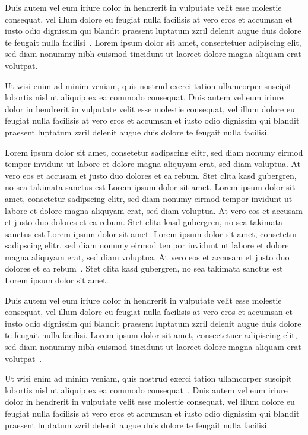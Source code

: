 \documentclass[journal]{vgtc}
\begin{document}
Duis autem vel eum iriure dolor in hendrerit in vulputate velit esse
molestie consequat, vel illum dolore eu feugiat nulla facilisis at
vero eros et accumsan et iusto odio dignissim qui blandit praesent
luptatum zzril delenit augue duis dolore te feugait nulla
facilisi~\cite{notes2002}. Lorem ipsum dolor sit amet, consectetuer
adipiscing elit, sed diam nonummy nibh euismod tincidunt ut laoreet
dolore magna aliquam erat volutpat.

Ut wisi enim ad minim veniam, quis nostrud exerci tation ullamcorper
suscipit lobortis nisl ut aliquip ex ea commodo consequat. Duis autem
vel eum iriure dolor in hendrerit in vulputate velit esse molestie
consequat, vel illum dolore eu feugiat nulla facilisis at vero eros et
accumsan et iusto odio dignissim qui blandit praesent luptatum zzril
delenit augue duis dolore te feugait nulla facilisi.



Lorem ipsum dolor sit amet, consetetur sadipscing elitr, sed diam
nonumy eirmod tempor invidunt ut labore et dolore magna aliquyam erat,
sed diam voluptua. At vero eos et accusam et justo duo dolores et ea
rebum. Stet clita kasd gubergren, no sea takimata sanctus est Lorem
ipsum dolor sit amet. Lorem ipsum dolor sit amet, consetetur
sadipscing elitr, sed diam nonumy eirmod tempor invidunt ut labore et
dolore magna aliquyam erat, sed diam voluptua. At vero eos et accusam
et justo duo dolores et ea rebum. Stet clita kasd gubergren, no sea
takimata sanctus est Lorem ipsum dolor sit amet. Lorem ipsum dolor sit
amet, consetetur sadipscing elitr, sed diam nonumy eirmod tempor
invidunt ut labore et dolore magna aliquyam erat, sed diam
voluptua. At vero eos et accusam et justo duo dolores et ea
rebum~\cite{ware:2004:IVP}. Stet clita kasd gubergren, no sea takimata
sanctus est Lorem ipsum dolor sit amet.

Duis autem vel eum iriure dolor in hendrerit in vulputate velit esse
molestie consequat, vel illum dolore eu feugiat nulla facilisis at
vero eros et accumsan et iusto odio dignissim qui blandit praesent
luptatum zzril delenit augue duis dolore te feugait nulla
facilisi. Lorem ipsum dolor sit amet, consectetuer adipiscing elit,
sed diam nonummy nibh euismod tincidunt ut laoreet dolore magna
aliquam erat volutpat~\cite{kindlmann:1999:SAG}.

Ut wisi enim ad minim veniam, quis nostrud exerci tation ullamcorper
suscipit lobortis nisl ut aliquip ex ea commodo
consequat~\cite{levoy:1989:DSV}. Duis autem vel eum iriure dolor in
hendrerit in vulputate velit esse molestie consequat, vel illum dolore
eu feugiat nulla facilisis at vero eros et accumsan et iusto odio
dignissim qui blandit praesent luptatum zzril delenit augue duis
dolore te feugait nulla facilisi.
\end{document}
